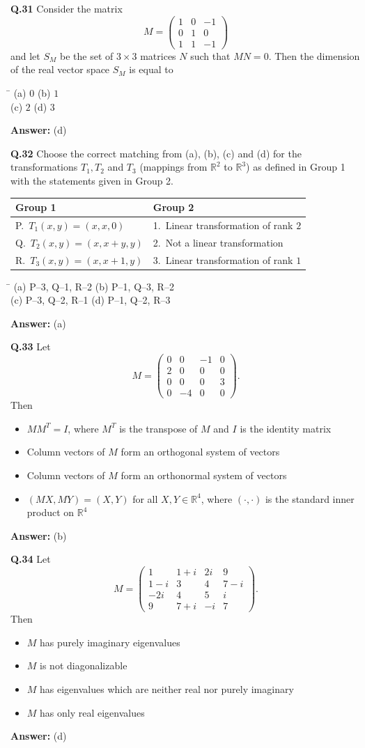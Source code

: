 \documentclass[11pt,a4paper]{article}
\newcommand{\optsfour}[4]{%
  \begin{tabbing}
    \hspace{0.48\linewidth}\=\kill
    (a) #1 \> (b) #2 \\[2pt]
    (c) #3 \> (d) #4
  \end{tabbing}%
}
\newcommand{\optslist}[4]{%
  \begin{itemize}
    \setlength{\itemsep}{2pt}\setlength{\parskip}{0pt}
    \item[(a)] #1
    \item[(b)] #2
    \item[(c)] #3
    \item[(d)] #4
  \end{itemize}%
}
\newcommand{\ans}[1]{\textbf{Answer:} #1\par\medskip}
\begin{document}
\textbf{Q.31} Consider the matrix
\[
  M = \begin{pmatrix} 1 & 0 & -1 \\ 0 & 1 & 0 \\ 1 & 1 & -1 \end{pmatrix}
\]
and let $S_M$ be the set of $3 \times 3$ matrices $N$ such that $MN = 0$. Then the dimension of the real vector space $S_M$ is equal to
\optsfour{$0$}{$1$}{$2$}{$3$}
\ans{(d)}

\textbf{Q.32} Choose the correct matching from (a), (b), (c) and (d) for the transformations $T_1, T_2$ and $T_3$ (mappings from $\mathbb{R}^2$ to $\mathbb{R}^3$) as defined in Group 1 with the statements given in Group 2.
\begin{center}
\begin{tabular}{ll}
  \toprule
  \textbf{Group 1} & \textbf{Group 2} \\
  \midrule
  P.\ $T_1(x,y) = (x, x, 0)$ & 1.\ Linear transformation of rank $2$ \\
  Q.\ $T_2(x,y) = (x, x+y, y)$ & 2.\ Not a linear transformation \\
  R.\ $T_3(x,y) = (x, x+1, y)$ & 3.\ Linear transformation of rank $1$ \\
  \bottomrule
\end{tabular}
\end{center}
\optsfour{P--3, Q--1, R--2}{P--1, Q--3, R--2}{P--3, Q--2, R--1}{P--1, Q--2, R--3}
\ans{(a)}

\textbf{Q.33} Let
\[
  M = \begin{pmatrix}
    0 & 0 & -1 & 0 \\
    2 & 0 & 0 & 0 \\
    0 & 0 & 0 & 3 \\
    0 & -4 & 0 & 0
  \end{pmatrix}.
\]
Then
\optslist{$MM^T = I$, where $M^T$ is the transpose of $M$ and $I$ is the identity matrix}{Column vectors of $M$ form an orthogonal system of vectors}{Column vectors of $M$ form an orthonormal system of vectors}{$(MX, MY) = (X, Y)$ for all $X, Y \in \mathbb{R}^4$, where $(\cdot,\cdot)$ is the standard inner product on $\mathbb{R}^4$}
\ans{(b)}

\textbf{Q.34} Let
\[
  M = \begin{pmatrix}
    1 & 1+i & 2i & 9 \\
    1-i & 3 & 4 & 7-i \\
    -2i & 4 & 5 & i \\
    9 & 7+i & -i & 7
  \end{pmatrix}.
\]
Then
\optslist{$M$ has purely imaginary eigenvalues}{$M$ is not diagonalizable}{$M$ has eigenvalues which are neither real nor purely imaginary}{$M$ has only real eigenvalues}
\ans{(d)}
\end{document}
